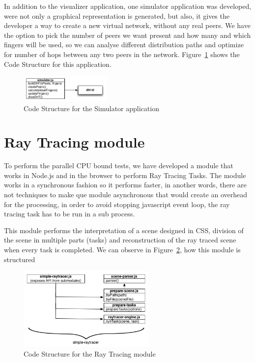 In addition to the visualizer application, one simulator application was developed, were not only a graphical representation is generated, but also, it gives the developer a way to create a new virtual network, without any real peers. We have the option to pick the number of peers we want present and how many and which fingers will be used, so we can analyse different distribution paths and optimize for number of hops between any two peers in the network. Figure~\ref{fig:d-s} shows the Code Structure for this application.


\begin{figure}[h!]
  \centering
  \includegraphics[width=0.4\textwidth]{figs/diagram-simulator}
  \caption{Code Structure for the Simulator application}
  \label{fig:d-s}
\end{figure}

\section{Ray Tracing module}

To perform the parallel CPU bound tests, we have developed a module that works in Node.js and in the browser to perform Ray Tracing Tasks. The module works in a synchronous fashion so it performs faster, in another words, there are not techniques to make que module asynchronous that would create an overhead for the processing, in order to avoid stopping javascript event loop, the ray tracing task has to be run in a sub process.

This module performs the interpretation of a scene designed in CSS, division of the scene in multiple parts (tasks) and reconstruction of the ray traced scene when every task is completed. We can observe in Figure~\ref{fig:d-s-r}, how this module is structured

\begin{figure}[h!]
  \centering
  \includegraphics[width=0.6\textwidth]{figs/diagram-simple-raytracer}
  \caption{Code Structure for the Ray Tracing module}
  \label{fig:d-s-r}
\end{figure}

